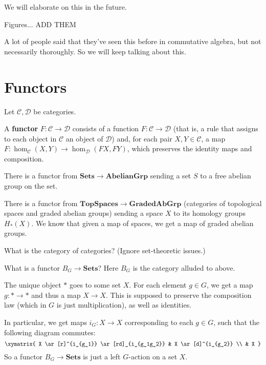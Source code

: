 We will elaborate on this in the future.


Figures... ADD THEM

\begin{remark} 
A lot of people said that they've seen this before in commutative algebra, but not necessarily
thoroughly.  So we will keep talking about this.
\end{remark} 


\section{Functors}
Let $\mathcal{C}, \mathcal{D}$ be categories.

\begin{definition} 
A \textbf{functor} $F: \mathcal{C} \to \mathcal{D}$ consists of a function $F:
\mathcal{C} \to  \mathcal{D}$ (that is, a rule that assigns to each object
in $\mathcal{C}$ an object of $\mathcal{D}$) and, for each pair $X, Y \in \mathcal{C}$,
a map
$F: \hom_{\mathcal{C}}(X, Y) \to \hom_{\mathcal{D}}(FX, FY)$, which preserves the identity
maps and composition. 
\end{definition} 


\begin{example} 
There is a functor from $\mathbf{Sets} \to \mathbf{AbelianGrp}$ sending a set
$S$ to a free abelian group on the set.
\end{example} 

\begin{example} 
There is a functor from $\mathbf{TopSpaces} \to \mathbf{GradedAbGrp}$
(categories of topological spaces and graded abelian groups) sending a
space $X$ to its homology groups $H_*(X)$. We know that given a map of spaces,
we get a map of graded abelian groups. 
\end{example} 

\begin{exercise} 
What is the category of categories? (Ignore set-theoretic issues.)
\end{exercise} 


\begin{example} 
What is a functor $B_G \stackrel{}{\to} \mathbf{Sets}$? Here $B_G$ is the
category alluded to above. 

The unique object $\ast$ goes to some set $X$. For each element $g \in G$, we
get a map $g: \ast \to \ast$ and thus a map $X \to X$. This is supposed to
preserve the composition law (which in $G$ is just multiplication), as well as
identities. 

In particular, we get maps $i_G: X \to X$ corresponding to each $g \in G$, such
that the following diagram commutes:
\[ \xymatrix{
X \ar[r]^{i_{g_1}} \ar[rd]_{i_{g_1g_2}} & X \ar[d]^{i_{g_2}} \\ & X 
}\]
So a functor $B_G \to \mathbf{Sets}$ is just a left $G$-action on a set $X$.
\end{example} 

